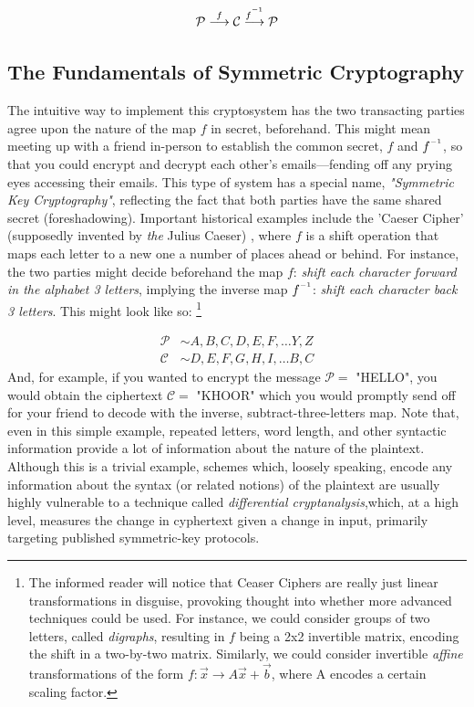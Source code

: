 \documentclass[11pt,a4paper]{article}
\newcommand{\inv}{^{\raisebox{.2em}{$\scriptscriptstyle-1$}}}
\begin{document}
$$ \mathcal{P} \overset{f}\longrightarrow \mathcal{C} \overset{f\inv}\longrightarrow \mathcal{P} $$

\subsection{The Fundamentals of Symmetric Cryptography}

The intuitive way to implement this cryptosystem has the two transacting parties agree upon the nature of the map $f$ in secret, beforehand. This might mean meeting up with a friend in-person to establish the common secret, $f$ and $f\inv$, so that you could encrypt and decrypt each other's emails—fending off any prying eyes accessing their emails. This type of system has a special name, \textit{"Symmetric Key Cryptography"}, reflecting the fact that both parties have the same shared secret (foreshadowing). Important historical examples include the 'Caeser Cipher' (supposedly invented by \textit{the} Julius Caeser)%
, where $f$ is a shift operation that maps each letter to a new one a number of places ahead or behind. For instance, the two parties might decide beforehand the map $f$: \textit{shift each character forward in the alphabet 3 letters}, implying the inverse map $f\inv$: \textit{shift each character back 3 letters}. This might look like so: \footnote{The informed reader will notice that Ceaser Ciphers are really just linear transformations in disguise, provoking thought into whether more advanced techniques could be used. For instance, we could consider groups of two letters, called \textit{digraphs}, resulting in $f$ being a 2x2 invertible matrix, encoding the shift in a two-by-two matrix. Similarly, we could consider invertible \textit{affine} transformations of the form $f:\vec{x} \to A\vec{x} + \vec{b}$, where A encodes a certain scaling factor.}

\begin{align*}
 \mathcal{P} &\sim A,B,C,D,E,F,…Y,Z  \\ 
 \mathcal{C} &\sim D,E,F,G,H,I,…B,C 
\end{align*} %
And, for example, if you wanted to encrypt the message $\mathcal{P} =$ "HELLO", you would obtain the ciphertext $\mathcal{C} =$ "KHOOR" which you would promptly send off for your friend to decode with the inverse, subtract-three-letters map. Note that, even in this simple example, repeated letters, word length, and other syntactic information provide a lot of information about the nature of the plaintext. Although this is a trivial example, schemes which, loosely speaking, encode any information about the syntax (or related notions) of the plaintext are usually highly vulnerable to a technique called \textit{differential cryptanalysis},which, at a high level, measures the change in cyphertext given a change in input, primarily targeting published symmetric-key protocols.\autocite[56]{koblitz} 
\end{document}
